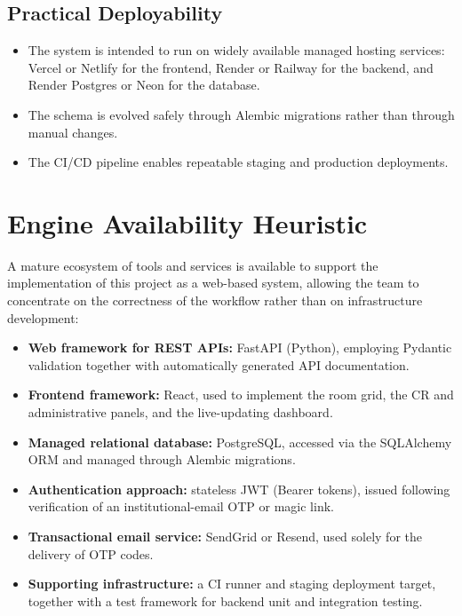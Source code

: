\documentclass[11pt]{article}
\begin{document}
\subsection{Practical Deployability}

\begin{itemize}
    \item The system is intended to run on widely available managed hosting services: Vercel or Netlify for the frontend, Render or Railway for the backend, and Render Postgres or Neon for the database.
    \item The schema is evolved safely through Alembic migrations rather than through manual changes.
    \item The CI/CD pipeline enables repeatable staging and production deployments.
\end{itemize}

\section{Engine Availability Heuristic}

A mature ecosystem of tools and services is available to support the implementation of this project as a web-based system, allowing the team to concentrate on the correctness of the workflow rather than on infrastructure development:

\begin{itemize}
    \item \textbf{Web framework for REST APIs:} FastAPI (Python), employing Pydantic validation together with automatically generated API documentation.
    \item \textbf{Frontend framework:} React, used to implement the room grid, the CR and administrative panels, and the live-updating dashboard.
    \item \textbf{Managed relational database:} PostgreSQL, accessed via the SQLAlchemy ORM and managed through Alembic migrations.
    \item \textbf{Authentication approach:} stateless JWT (Bearer tokens), issued following verification of an institutional-email OTP or magic link.
    \item \textbf{Transactional email service:} SendGrid or Resend, used solely for the delivery of OTP codes.
    \item \textbf{Supporting infrastructure:} a CI runner and staging deployment target, together with a test framework for backend unit and integration testing.
\end{itemize}
\end{document}
